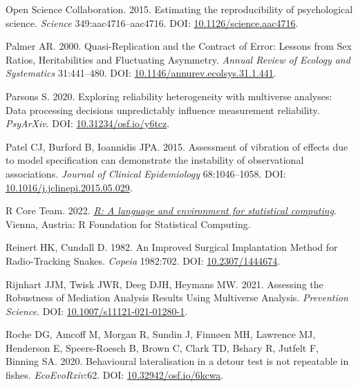 \documentclass[10pt,a4paper]{article}
\newlength{\cslhangindent}
\newlength{\cslentryspacingunit} %
\newenvironment{CSLReferences}[2] %
 {%
  \setlength{\parindent}{0pt}
  \ifodd #1
  \let\oldpar\par
  \def\par{\hangindent=\cslhangindent\oldpar}
  \fi
  \setlength{\parskip}{#2\cslentryspacingunit}
 }%
 {}
\begin{document}
\begin{CSLReferences}{1}{0}
\leavevmode{}%
Open Science Collaboration. 2015. Estimating the reproducibility of psychological science. \emph{Science} 349:aac4716--aac4716. DOI: \href{https://doi.org/10.1126/science.aac4716}{10.1126/science.aac4716}.

\leavevmode{}%
Palmer AR. 2000. Quasi-{Replication} and the {Contract} of {Error}: {Lessons} from {Sex} {Ratios}, {Heritabilities} and {Fluctuating} {Asymmetry}. \emph{Annual Review of Ecology and Systematics} 31:441--480. DOI: \href{https://doi.org/10.1146/annurev.ecolsys.31.1.441}{10.1146/annurev.ecolsys.31.1.441}.

\leavevmode{}%
Parsons S. 2020. Exploring reliability heterogeneity with multiverse analyses: {Data} processing decisions unpredictably influence measurement reliability. \emph{PsyArXiv}. DOI: \href{https://doi.org/10.31234/osf.io/y6tcz}{10.31234/osf.io/y6tcz}.

\leavevmode{}%
Patel CJ, Burford B, Ioannidis JPA. 2015. Assessment of vibration of effects due to model specification can demonstrate the instability of observational associations. \emph{Journal of Clinical Epidemiology} 68:1046--1058. DOI: \href{https://doi.org/10.1016/j.jclinepi.2015.05.029}{10.1016/j.jclinepi.2015.05.029}.

\leavevmode{}%
R Core Team. 2022. \emph{\href{https://www.R-project.org/}{R: A language and environment for statistical computing}}. Vienna, Austria: R Foundation for Statistical Computing.

\leavevmode{}%
Reinert HK, Cundall D. 1982. An {Improved} {Surgical} {Implantation} {Method} for {Radio}-{Tracking} {Snakes}. \emph{Copeia} 1982:702. DOI: \href{https://doi.org/10.2307/1444674}{10.2307/1444674}.

\leavevmode{}%
Rijnhart JJM, Twisk JWR, Deeg DJH, Heymans MW. 2021. Assessing the {Robustness} of {Mediation} {Analysis} {Results} {Using} {Multiverse} {Analysis}. \emph{Prevention Science}. DOI: \href{https://doi.org/10.1007/s11121-021-01280-1}{10.1007/s11121-021-01280-1}.

\leavevmode{}%
Roche DG, Amcoff M, Morgan R, Sundin J, Finnøen MH, Lawrence MJ, Henderson E, Speers-Roesch B, Brown C, Clark TD, Bshary R, Jutfelt F, Binning SA. 2020. Behavioural lateralisation in a detour test is not repeatable in fishes. \emph{EcoEvoRxiv}:62. DOI: \href{https://doi.org/10.32942/osf.io/6kcwa}{10.32942/osf.io/6kcwa}.


\end{CSLReferences}
\end{document}
